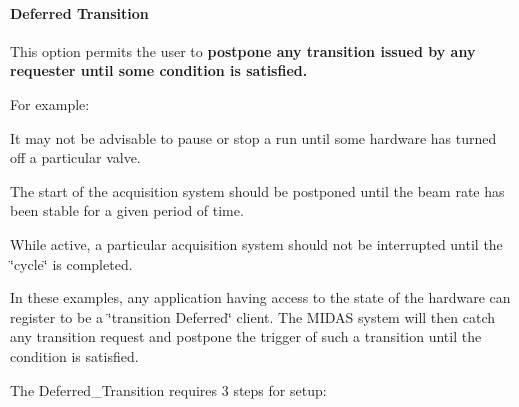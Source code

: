 \par


\par
 \label{FE_event_notification_idx_transition_deferred}
\hypertarget{FE_event_notification_idx_transition_deferred}{}
 \hypertarget{FE_event_notification_FE_Deferred_Transition}{}\paragraph{Deferred Transition}\label{FE_event_notification_FE_Deferred_Transition}
This option permits the user to {\bfseries postpone any transition issued by any requester until some condition is satisfied.} \par
 For example:
\begin{DoxyItemize}
\item It may not be advisable to pause or stop a run until some hardware has turned off a particular valve.
\item The start of the acquisition system should be postponed until the beam rate has been stable for a given period of time.
\item While active, a particular acquisition system should not be interrupted until the \char`\"{}cycle\char`\"{} is completed.
\end{DoxyItemize}

In these examples, any application having access to the state of the hardware can register to be a \char`\"{}transition Deferred\char`\"{} client. The MIDAS system will then catch any transition request and postpone the trigger of such a transition until the condition is satisfied. \par
 The Deferred\_\-Transition requires 3 steps for setup:


